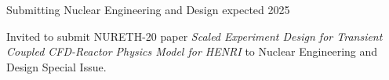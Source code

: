 

    \cventry
    {Submitting} %
    {Nuclear Engineering and Design} %
    {} %
    {expected 2025} %
    {
    \begin{cvitems}
        \item{Invited to submit NURETH-20 paper \textit{Scaled Experiment Design for Transient Coupled CFD-Reactor Physics Model for HENRI} to Nuclear Engineering and Design Special Issue.}
    \end{cvitems}
    }



